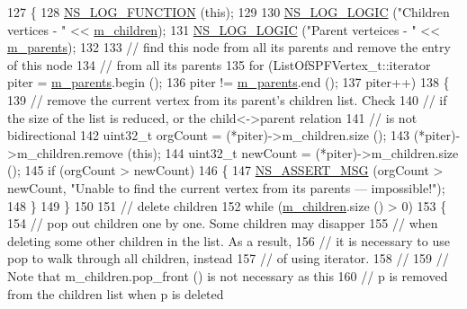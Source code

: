\begin{DoxyCode}
127 \{
128   \hyperlink{log-macros-disabled_8h_a90b90d5bad1f39cb1b64923ea94c0761}{NS\_LOG\_FUNCTION} (\textcolor{keyword}{this});
129 
130   \hyperlink{group__logging_ga88acd260151caf2db9c0fc84997f45ce}{NS\_LOG\_LOGIC} (\textcolor{stringliteral}{"Children vertices - "} << \hyperlink{classns3_1_1SPFVertex_af075e299721e613e5514392c3b3122c4}{m\_children});
131   \hyperlink{group__logging_ga88acd260151caf2db9c0fc84997f45ce}{NS\_LOG\_LOGIC} (\textcolor{stringliteral}{"Parent verteices - "} << \hyperlink{classns3_1_1SPFVertex_af644854d7d83ccd2200a657dceaea0f8}{m\_parents});
132 
133   \textcolor{comment}{// find this node from all its parents and remove the entry of this node}
134   \textcolor{comment}{// from all its parents}
135   \textcolor{keywordflow}{for} (ListOfSPFVertex\_t::iterator piter = \hyperlink{classns3_1_1SPFVertex_af644854d7d83ccd2200a657dceaea0f8}{m\_parents}.begin (); 
136        piter != \hyperlink{classns3_1_1SPFVertex_af644854d7d83ccd2200a657dceaea0f8}{m\_parents}.end ();
137        piter++)
138     \{
139       \textcolor{comment}{// remove the current vertex from its parent's children list. Check}
140       \textcolor{comment}{// if the size of the list is reduced, or the child<->parent relation}
141       \textcolor{comment}{// is not bidirectional}
142       uint32\_t orgCount = (*piter)->m\_children.size ();
143       (*piter)->m\_children.remove (\textcolor{keyword}{this});
144       uint32\_t newCount = (*piter)->m\_children.size ();
145       \textcolor{keywordflow}{if} (orgCount > newCount)
146         \{
147           \hyperlink{assert_8h_aff5ece9066c74e681e74999856f08539}{NS\_ASSERT\_MSG} (orgCount > newCount, \textcolor{stringliteral}{"Unable to find the current vertex from its
       parents --- impossible!"});
148         \}
149     \}
150 
151   \textcolor{comment}{// delete children}
152   \textcolor{keywordflow}{while} (\hyperlink{classns3_1_1SPFVertex_af075e299721e613e5514392c3b3122c4}{m\_children}.size () > 0)
153     \{
154       \textcolor{comment}{// pop out children one by one. Some children may disapper }
155       \textcolor{comment}{// when deleting some other children in the list. As a result,}
156       \textcolor{comment}{// it is necessary to use pop to walk through all children, instead}
157       \textcolor{comment}{// of using iterator.}
158       \textcolor{comment}{//}
159       \textcolor{comment}{// Note that m\_children.pop\_front () is not necessary as this}
160       \textcolor{comment}{// p is removed from the children list when p is deleted}

\end{DoxyCode}
